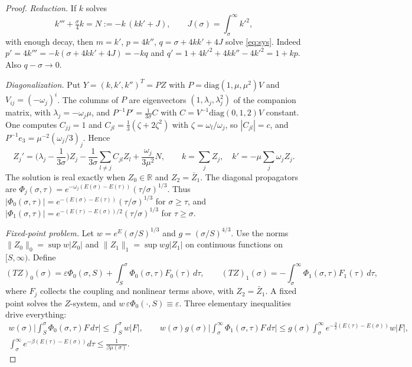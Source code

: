 \documentclass[11pt]{amsart}
\theoremstyle{remark}
\newcommand{\R}{\mathbb{R}}
\newcommand{\eps}{\varepsilon}
\begin{document}
\begin{proof}
\emph{Reduction.} If $k$ solves
\begin{equation}\label{eq:k}
k'''+\tfrac{\sigma}{4}k=N:=-k\,(kk'+J),\qquad J(\sigma)=\int_\sigma^\infty k'^2,
\end{equation}
with enough decay, then $m=k'$, $p=4k''$, $q=\sigma+4kk'+4J$ solve \eqref{eq:sys}. Indeed $p'=4k'''=-k(\sigma+4kk'+4J)=-kq$ and $q'=1+4k'^2+4kk''-4k'^2=1+kp$. Also $q-\sigma\to0$.

\emph{Diagonalization.} Put $Y=(k,k',k'')^T=P Z$ with $P=\mathrm{diag}(1,\mu,\mu^2)V$ and $V_{ij}=(-\omega_j)^i$. The columns of $P$ are eigenvectors $(1,\lambda_j,\lambda_j^2)$ of the companion matrix, with $\lambda_j=-\omega_j\mu$, and $P^{-1}P'=\frac1{3\sigma}C$ with $C=V^{-1}\mathrm{diag}(0,1,2)V$ constant. One computes $C_{jj}=1$ and $C_{jl}=\frac13(\zeta+2\zeta^2)$ with $\zeta=\omega_l/\omega_j$, so $|C_{jl}|=c$, and $P^{-1}e_3=\mu^{-2}(\omega_j/3)_j$. Hence
\[
Z_j'=\Big(\lambda_j-\frac1{3\sigma}\Big)Z_j-\frac1{3\sigma}\sum_{l\ne j}C_{jl}Z_l+\frac{\omega_j}{3\mu^2}N,
\qquad k=\textstyle\sum_jZ_j,\quad k'=-\mu\sum_j\omega_jZ_j .
\]
The solution is real exactly when $Z_0\in\R$ and $Z_2=\bar Z_1$. The diagonal propagators are $\Phi_j(\sigma,\tau)=e^{-\omega_j(E(\sigma)-E(\tau))}(\tau/\sigma)^{1/3}$. Thus $|\Phi_0(\sigma,\tau)|=e^{-(E(\sigma)-E(\tau))}(\tau/\sigma)^{1/3}$ for $\sigma\ge\tau$, and $|\Phi_1(\sigma,\tau)|=e^{-(E(\tau)-E(\sigma))/2}(\tau/\sigma)^{1/3}$ for $\tau\ge\sigma$.

\emph{Fixed-point problem.} Let $w=e^{E}(\sigma/S)^{1/3}$ and $g=(\sigma/S)^{4/3}$. Use the norms $\|Z_0\|_0=\sup w|Z_0|$ and $\|Z_1\|_1=\sup wg|Z_1|$ on continuous functions on $[S,\infty)$. Define
\[
(TZ)_0(\sigma)=\eps\Phi_0(\sigma,S)+\int_S^\sigma\Phi_0(\sigma,\tau)F_0(\tau)\,d\tau,\qquad
(TZ)_1(\sigma)=-\int_\sigma^\infty\Phi_1(\sigma,\tau)F_1(\tau)\,d\tau,
\]
where $F_j$ collects the coupling and nonlinear terms above, with $Z_2=\bar Z_1$. A fixed point solves the $Z$-system, and $w\,\eps\Phi_0(\cdot,S)\equiv\eps$. Three elementary inequalities drive everything:
\begin{gather*}
w(\sigma)\Big|\int_S^\sigma\Phi_0(\sigma,\tau)F\,d\tau\Big|\le\int_S^\sigma w|F|,\qquad
w(\sigma)g(\sigma)\Big|\int_\sigma^\infty\Phi_1(\sigma,\tau)F\,d\tau\Big|\le g(\sigma)\int_\sigma^\infty e^{-\frac32(E(\tau)-E(\sigma))}w|F|,\\
\int_\sigma^\infty e^{-\beta(E(\tau)-E(\sigma))}d\tau\le\frac1{\beta\mu(\sigma)}.
\end{gather*}


\end{proof}
\end{document}
